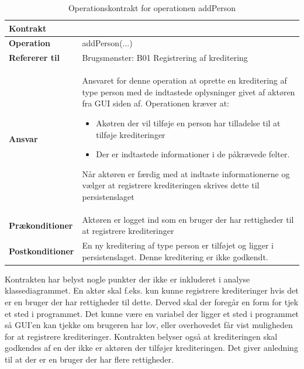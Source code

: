 \begin{table}[H]
\centering
\label{tab:2}
    \begin{tabular}{|p{35mm}|p{70mm}|} \hline
        \textbf{Kontrakt} &  \\ \hline
        \textbf{Operation} & addPerson(...) \\ \hline
        \textbf{Refererer til} & Brugsmønster: B01 Registrering af kreditering \\ \hline
        \textbf{Ansvar} & Ansvaret for denne operation at oprette en kreditering af type person med de indtastede oplysninger givet af aktøren fra GUI siden af. Operationen kræver at:
        \begin{itemize}
            \item Akøtren der vil tilføje en person har tilladelse til at tilføje krediteringer
            \item Der er indtastede informationer i de påkrævede felter. 
        \end{itemize}
        Når aktøren er færdig med at indtaste informationerne og vælger at registrere krediteringen skrives dette til persistenslaget
        \\ \hline
        \textbf{Prækonditioner} & Aktøren er logget ind som en bruger der har rettigheder til at registrere krediteringer\\ \hline
        \textbf{Postkonditioner} &
        En ny kreditering af type person er tilføjet og ligger i persistenslaget. Denne kreditering er ikke godkendt.\\ \hline
    \end{tabular}
        \caption{Operationskontrakt for operationen addPerson}
        \label{tab:OperationsKontraktB01}
\end{table}

Kontrakten har belyst nogle punkter der ikke er inkluderet i analyse klassediagrammet. En aktør skal f.eks. kun kunne registrere krediteringer hvis det er en bruger der har rettigheder til dette. Derved skal der foregår en form for tjek et sted i programmet. Det kunne være en variabel der ligger et sted i programmet så GUI'en kan tjekke om brugeren har lov, eller overhovedet får vist muligheden for at registrere krediteringer. Kontrakten belyser også at krediteringen skal godkendes af en der ikke er aktøren der tilføjer krediteringen. Det giver anledning til at der er en bruger der har flere rettigheder.
 
